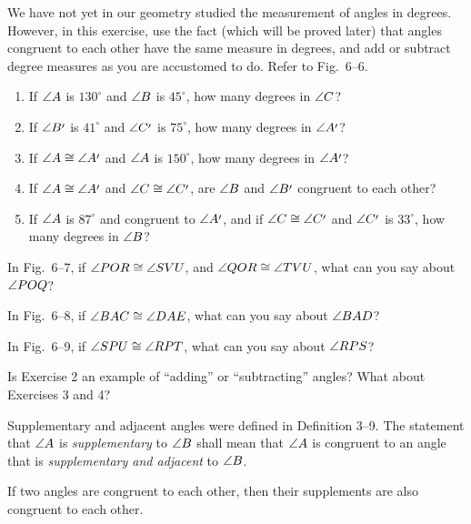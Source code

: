 \documentclass[11pt]{book}
\begin{document}
\begin{exercisecols}
\begin{exlist}
\item We have not yet in our geometry studied the measurement of angles in
  degrees. However, in this exercise, use the fact (which will be proved later)
  that angles congruent to each other have the same measure in degrees, and add
  or subtract degree measures as you are accustomed to do. Refer to Fig.~6--6.
  \begin{enumerate}[label=(\alph*), leftmargin=2.2em, itemsep=1pt, topsep=3pt]
  \item If $\angle A$ is $130^\circ$ and $\angle B$ is $45^\circ$, how many
    degrees in $\angle C$?
  \item If $\ang{B\VIpr}$ is $41^\circ$ and $\ang{C\VIpr}$ is $75^\circ$, how
    many degrees in $\ang{A\VIpr}$?
  \item If $\ang{A} \cong \ang{A\VIpr}$ and $\angle A$ is $150^\circ$, how many
    degrees in $\ang{A\VIpr}$?
  \item If $\ang{A} \cong \ang{A\VIpr}$ and $\ang{C} \cong \ang{C\VIpr}$, are
    $\angle B$ and $\ang{B\VIpr}$ congruent to each other?
  \item If $\angle A$ is $87^\circ$ and congruent to $\ang{A\VIpr}$, and if
    $\ang{C} \cong \ang{C\VIpr}$ and $\ang{C\VIpr}$ is $33^\circ$, how many
    degrees in $\angle B$?
  \end{enumerate}
\exfig{\FIGVISIX}
\item In Fig.~6--7, if $\angle POR \cong \angle SVU$, and $\angle QOR \cong
  \angle TVU$, what can you say about $\angle POQ$?
\exfig{\FIGVISEVEN}
\item In Fig.~6--8, if $\angle BAC \cong \angle DAE$, what can you say about
  $\angle BAD$?
\exfig{\FIGVIEIGHT}
\item In Fig.~6--9, if $\angle SPU \cong \angle RPT$, what can you say about
  $\angle RPS$?
\exfig{\FIGVININE}
\item Is Exercise 2 an example of ``adding'' or ``subtracting'' angles? What
  about Exercises 3 and 4?
\end{exlist}
\end{exercisecols}

Supplementary and adjacent angles were defined in Definition 3--9. The
statement that $\angle A$ is \emph{supplementary} to $\angle B$ shall mean that
$\angle A$ is congruent to an angle that is \emph{supplementary and adjacent} to
$\angle B$.

\begin{theorem}
If two angles are congruent to each other, then their supplements are also
congruent to each other.
\end{theorem}
\end{document}
